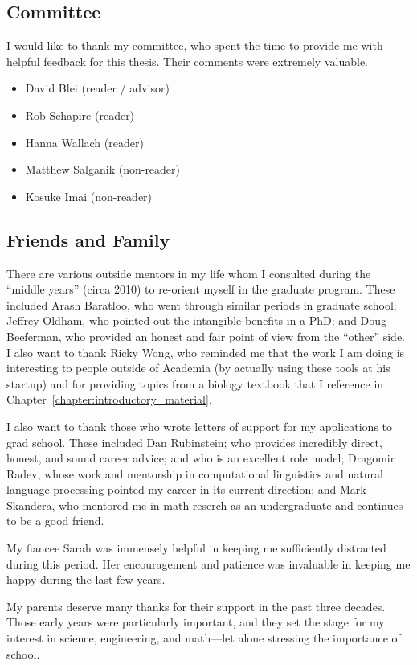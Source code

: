 \subsection*{Committee}
I would like to thank my committee, who spent the time to provide me
with helpful feedback for this thesis.  Their comments were extremely valuable.
\begin{itemize}
  \item David Blei (reader / advisor)
  \item Rob Schapire (reader)
  \item Hanna Wallach (reader)
  \item Matthew Salganik (non-reader)
  \item Kosuke Imai (non-reader)
\end{itemize}

\subsection*{Friends and Family}

There are various outside mentors in my life whom I consulted during
the ``middle years'' (circa 2010) to re-orient myself in the graduate
program. These included Arash Baratloo, who went through similar
periods in graduate school; Jeffrey Oldham, who pointed out the
intangible benefits in a PhD; and Doug Beeferman, who provided an
honest and fair point of view from the ``other'' side.  I also want to
thank Ricky Wong, who reminded me that the work I am doing is
interesting to people outside of Academia (by actually using these
tools at his startup) and for providing topics from a biology textbook
that I reference in Chapter~\ref{chapter:introductory_material}.

I also want to thank those who wrote letters of support for my
applications to grad school.  These included Dan Rubinstein; who
provides incredibly direct, honest, and sound career advice; and who
is an excellent role model; Dragomir Radev, whose work and mentorship
in computational linguistics and natural language processing pointed
my career in its current direction; and Mark Skandera, who mentored me
in math reserch as an undergraduate and continues to be a good friend.

My fiancee Sarah was immensely helpful in keeping me sufficiently
distracted during this period.  Her encouragement and patience was
invaluable in keeping me happy during the last few years.

My parents deserve many thanks for their support in the past three
decades.  Those early years were particularly important, and they set
the stage for my interest in science, engineering, and math---let
alone stressing the importance of school.

